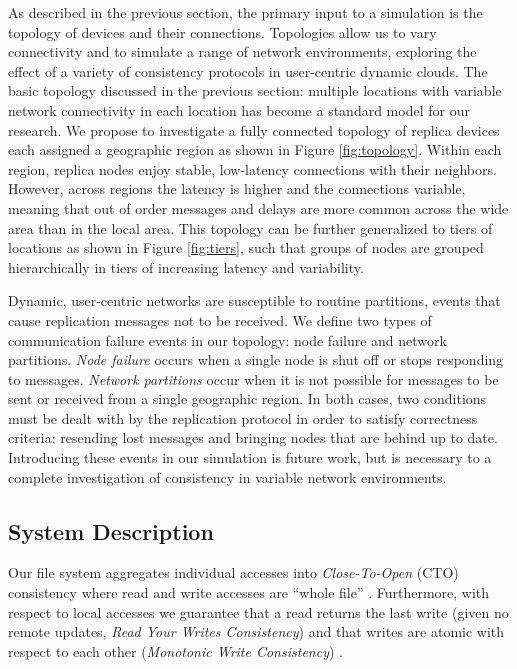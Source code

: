 \documentclass{article}
\begin{document}
As described in the previous section, the primary input to a simulation is the topology of devices and their connections. Topologies allow us to vary connectivity and to simulate a range of network environments, exploring the effect of a variety of consistency protocols in user-centric dynamic clouds. The basic topology discussed in the previous section: multiple locations with variable network connectivity in each location has become a standard model for our research. We propose to investigate a fully connected topology of replica devices each assigned a geographic region as shown in Figure \ref{fig:topology}. Within each region, replica nodes enjoy stable, low-latency connections with their neighbors. However, across regions the latency is higher and the connections variable, meaning that out of order messages and delays are more common across the wide area than in the local area. This topology can be further generalized to tiers of locations as shown in Figure \ref{fig:tiers}, such that groups of nodes are grouped hierarchically in tiers of increasing latency and variability.

Dynamic, user-centric networks are susceptible to routine partitions, events that cause replication messages not to be received. We define two types of communication failure events in our topology: node failure and network partitions. \textit{Node failure} occurs when a single node is shut off or stops responding to messages. \textit{Network partitions} occur when it is not possible for messages to be sent or received from a single geographic region. In both cases, two conditions must be dealt with by the replication protocol in order to satisfy correctness criteria: resending lost messages and bringing nodes that are behind up to date. Introducing these events in our simulation is future work, but is necessary to a complete investigation of consistency in variable network environments.

\subsection{System Description}

Our file system aggregates individual accesses into \textit{Close-To-Open} (CTO) consistency where read and write accesses are ``whole file'' \cite{muthitacharoen_low-bandwidth_2001}. Furthermore, with respect to local accesses we guarantee that a read returns the last write (given no remote updates, \textit{Read Your Writes Consistency}) and that writes are atomic with respect to each other (\textit{Monotonic Write Consistency}) \cite{bermbach_consistency_2013}.
\end{document}
